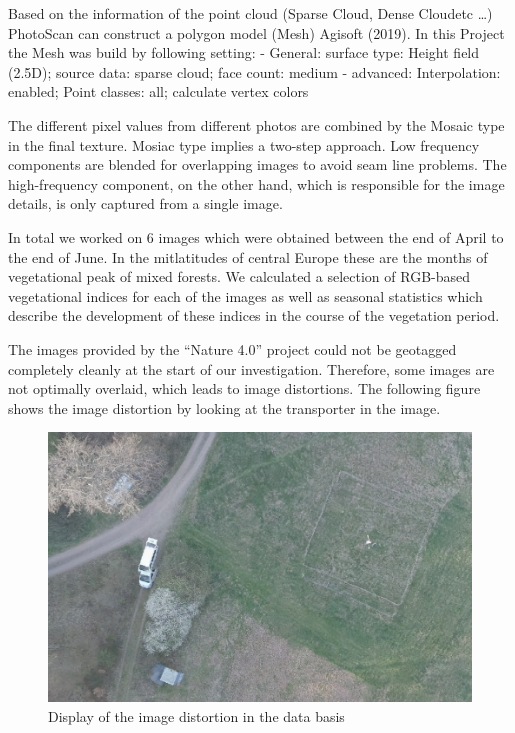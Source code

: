 \documentclass[]{article}
\begin{document}
Based on the information of the point cloud (Sparse Cloud, Dense
Cloudetc \ldots{}) PhotoScan can construct a polygon model (Mesh)
Agisoft (2019). In this Project the Mesh was build by following setting:
- General: surface type: Height field (2.5D); source data: sparse cloud;
face count: medium - advanced: Interpolation: enabled; Point classes:
all; calculate vertex colors

The different pixel values from different photos are combined by the
Mosaic type in the final texture. Mosiac type implies a two-step
approach. Low frequency components are blended for overlapping images to
avoid seam line problems. The high-frequency component, on the other
hand, which is responsible for the image details, is only captured from
a single image.

In total we worked on 6 images which were obtained between the end of
April to the end of June. In the mitlatitudes of central Europe these
are the months of vegetational peak of mixed forests. We calculated a
selection of RGB-based vegetational indices for each of the images as
well as seasonal statistics which describe the development of these
indices in the course of the vegetation period.

The images provided by the ``Nature 4.0'' project could not be geotagged
completely cleanly at the start of our investigation. Therefore, some
images are not optimally overlaid, which leads to image distortions. The
following figure shows the image distortion by looking at the
transporter in the image.

\begin{figure}[H]

{\centering \includegraphics{report_files/figure-latex/Image distortion-1} 

}

\caption{Display of the image distortion in the data basis}\label{fig:Image distortion}
\end{figure}
\end{document}
